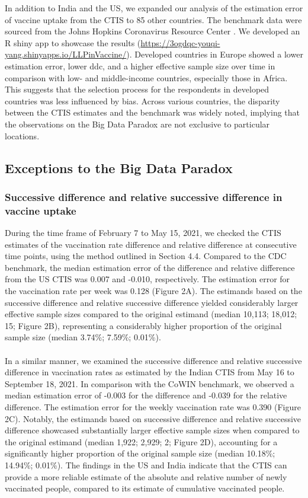 \documentclass{article}
\begin{document}
In addition to India and the US, we expanded our analysis of the estimation error of vaccine uptake from the CTIS to 85 other countries. The benchmark data were sourced from the Johns Hopkins Coronavirus Resource Center \citep{Dong2020-or}. We developed an R shiny app to showcase the results (\url{https://3ogdqc-youqi-yang.shinyapps.io/LLPinVaccine/}). Developed countries in Europe showed a lower estimation error, lower ddc, and a higher effective sample size over time in comparison with low- and middle-income countries, especially those in Africa. This suggests that the selection process for the respondents in developed countries was less influenced by bias. Across various countries, the disparity between the CTIS estimates and the benchmark was widely noted, implying that the observations on the Big Data Paradox are not exclusive to particular locations. 

\subsection{Exceptions to the Big Data Paradox}

\subsubsection{Successive difference and relative successive difference in vaccine uptake}

During the time frame of February 7 to May 15, 2021, we checked the CTIS estimates of the vaccination rate difference and relative difference at consecutive time points, using the method outlined in Section 4.4. Compared to the CDC benchmark, the median estimation error of the difference and relative difference from the US CTIS was 0.007 and -0.010, respectively. The estimation error for the vaccination rate per week was 0.128 (Figure 2A). The estimands based on the successive difference and relative successive difference yielded considerably larger effective sample sizes compared to the original estimand (median 10,113; 18,012; 15; Figure 2B), representing a considerably higher proportion of the original sample size (median 3.74\%; 7.59\%; 0.01\%). 
\\
\\
In a similar manner, we examined the successive difference and relative successive difference in vaccination rates as estimated by the Indian CTIS from May 16 to September 18, 2021. In comparison with the CoWIN benchmark, we observed a median estimation error of -0.003 for the difference and -0.039 for the relative difference. The estimation error for the weekly vaccination rate was 0.390 (Figure 2C). Notably, the estimands based on successive difference and relative successive difference showcased substantially larger effective sample sizes when compared to the original estimand (median 1,922; 2,929; 2; Figure 2D), accounting for a significantly higher proportion of the original sample size (median 10.18\%; 14.94\%; 0.01\%). The findings in the US and India indicate that the CTIS can provide a more reliable estimate of the absolute and relative number of newly vaccinated people, compared to its estimate of cumulative vaccinated people.
\end{document}
